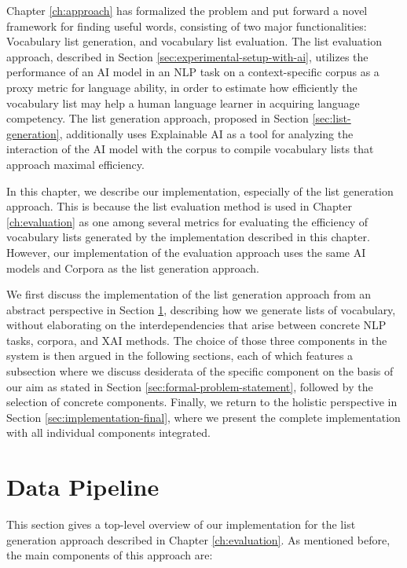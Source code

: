 Chapter \ref{ch:approach} has formalized the problem and put forward a novel framework for finding useful words, consisting of two major functionalities:
Vocabulary list generation, and vocabulary list evaluation.
The list evaluation approach, described in Section \ref{sec:experimental-setup-with-ai}, utilizes the performance of an AI model in an NLP task on a context-specific corpus as a proxy metric for language ability, in order to estimate how efficiently the vocabulary list may help a human language learner in acquiring language competency.
The list generation approach, proposed in Section \ref{sec:list-generation}, additionally uses Explainable AI as a tool for analyzing the interaction of the AI model with the corpus to compile vocabulary lists that approach maximal efficiency.

In this chapter, we describe our implementation, especially of the list generation approach.
This is because the list evaluation method is used in Chapter \ref{ch:evaluation} as one among several metrics for evaluating the efficiency of vocabulary lists generated by the implementation described in this chapter.
However, our implementation of the evaluation approach uses the same AI models and Corpora as the list generation approach.

We first discuss the implementation of the list generation approach from an abstract perspective in Section \ref{sec:data-pipeline}, describing how we generate lists of vocabulary, without elaborating on the interdependencies that arise between concrete NLP tasks, corpora, and XAI methods.
The choice of those three components in the system is then argued in the following sections, each of which features a subsection where we discuss desiderata of the specific component on the basis of our aim as stated in Section \ref{sec:formal-problem-statement}, followed by the selection of concrete components.
Finally, we return to the holistic perspective in Section \ref{sec:implementation-final}, where we present the complete implementation with all individual components integrated.

\section{Data Pipeline} \label{sec:data-pipeline}

This section gives a top-level overview of our implementation for the list generation approach described in Chapter \ref{ch:evaluation}.
As mentioned before, the main components of this approach are:

